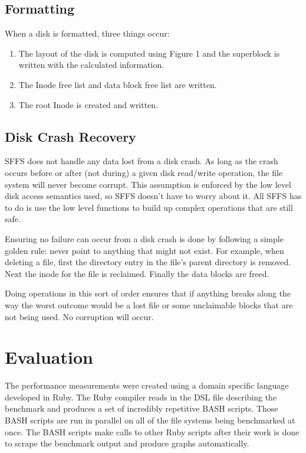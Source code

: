 \documentclass[10pt,twocolumn]{article}
\begin{document}
  \subsection{Formatting}
  When a disk is formatted, three things occur:
  \begin{enumerate}
    \item The layout of the disk is computed using Figure 1
          and the superblock is written with the calculated information.
    \item The Inode free list and data block free list are written.
    \item The root Inode is created and written.
  \end{enumerate}

  \subsection{Disk Crash Recovery}
  SFFS does not handle any data lost from a disk crash. As long as the crash 
  occurs before or after (not during) a given disk read/write operation, 
  the file system will never become corrupt. This assumption is enforced by
  the low level disk access semantics used, so SFFS doesn't have to worry
  about it. All SFFS has to do is use the low level functions to build
  up complex operations that are still safe.

  Ensuring no failure can occur from a disk crash is done by following a simple
  golden rule: never point to anything that might not exist. For example, when
  deleting a file, first the directory entry in the file's parent directory is
  removed. Next the inode for the file is reclaimed. Finally the data blocks
  are freed.

  Doing operations in this sort of order ensures that if anything breaks
  along the way the worst outcome would be a lost file or some unclaimable
  blocks that are not being used. No corruption will occur.

\section{Evaluation}
The performance measurements were created using a domain specific language
developed in Ruby. The Ruby compiler reads in the DSL file describing the
benchmark and produces a set of incredibly repetitive BASH scripts. Those BASH 
scripts are run in parallel on all of the file systems being benchmarked at 
once. The BASH scripts make calls to other Ruby scripts after their work is 
done to scrape the benchmark output and produce graphs automatically.
\end{document}
